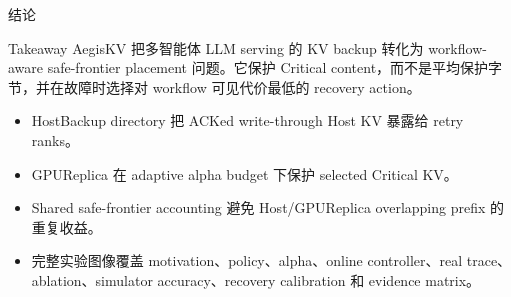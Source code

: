 \documentclass[aspectratio=43]{beamer}
\newcommand{\tightitems}{\setlength{\itemsep}{2pt}\setlength{\parskip}{0pt}}
\newcommand{\AegisKV}{AegisKV}
\newcommand{\Critical}{Critical}
\begin{document}
\begin{frame}{结论}
  \small
  \begin{block}{Takeaway}
    \AegisKV{} 把多智能体 LLM serving 的 KV backup 转化为 workflow-aware safe-frontier placement 问题。它保护 \Critical{} content，而不是平均保护字节，并在故障时选择对 workflow 可见代价最低的 recovery action。
  \end{block}

  \vspace{0.12cm}
  \begin{itemize}
    \tightitems
    \item HostBackup directory 把 ACKed write-through Host KV 暴露给 retry ranks。
    \item GPUReplica 在 adaptive alpha budget 下保护 selected \Critical{} KV。
    \item Shared safe-frontier accounting 避免 Host/GPUReplica overlapping prefix 的重复收益。
    \item 完整实验图像覆盖 motivation、policy、alpha、online controller、real trace、ablation、simulator accuracy、recovery calibration 和 evidence matrix。
  \end{itemize}
\end{frame}
\end{document}
